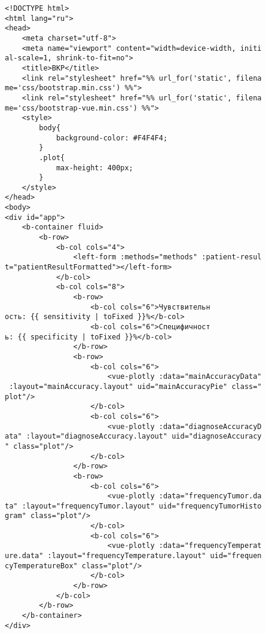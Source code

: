 \begin{verbatim}
<!DOCTYPE html>
<html lang="ru">
<head>
    <meta charset="utf-8">
    <meta name="viewport" content="width=device-width, initi
al-scale=1, shrink-to-fit=no">
    <title>ВКР</title>
    <link rel="stylesheet" href="%% url_for('static', filena
me='css/bootstrap.min.css') %%">
    <link rel="stylesheet" href="%% url_for('static', filena
me='css/bootstrap-vue.min.css') %%">
    <style>
        body{
            background-color: #F4F4F4;
        }
        .plot{
            max-height: 400px;
        }
    </style>
</head>
<body>
<div id="app">
    <b-container fluid>
        <b-row>
            <b-col cols="4">
                <left-form :methods="methods" :patient-resul
t="patientResultFormatted"></left-form>
            </b-col>
            <b-col cols="8">
                <b-row>
                    <b-col cols="6">Чувствительн
ость: {{ sensitivity | toFixed }}%</b-col>
                    <b-col cols="6">Специфичност
ь: {{ specificity | toFixed }}%</b-col>
                </b-row>
                <b-row>
                    <b-col cols="6">
                        <vue-plotly :data="mainAccuracyData"
 :layout="mainAccuracy.layout" uid="mainAccuracyPie" class="
plot"/>
                    </b-col>
                    <b-col cols="6">
                        <vue-plotly :data="diagnoseAccuracyD
ata" :layout="diagnoseAccuracy.layout" uid="diagnoseAccuracy
" class="plot"/>
                    </b-col>
                </b-row>
                <b-row>
                    <b-col cols="6">
                        <vue-plotly :data="frequencyTumor.da
ta" :layout="frequencyTumor.layout" uid="frequencyTumorHisto
gram" class="plot"/>
                    </b-col>
                    <b-col cols="6">
                        <vue-plotly :data="frequencyTemperat
ure.data" :layout="frequencyTemperature.layout" uid="frequen
cyTemperatureBox" class="plot"/>
                    </b-col>
                </b-row>
            </b-col>
        </b-row>
    </b-container>
</div>


\end{verbatim}
